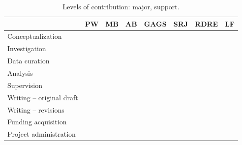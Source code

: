 \documentclass[journal=jctcce, manuscript=article]{achemso}
\begin{document}
\begin{table}
  \caption{Levels of contribution: \textcolor{blue!100}{major}, \textcolor{blue!25}{support}.}
  \label{tbl:example}
  \begin{tabular}{lccccccc}
    \toprule
                              & PW                   & MB                   & AB                   & GAGS                 & SRJ                  & RDRE                 & LF  \\
    \midrule
    Conceptualization         & \cellcolor{blue!100} &                      &   &                      & \cellcolor{blue!100} &                      & \cellcolor{blue!25}  \\ 
    Investigation             & \cellcolor{blue!100} & \cellcolor{blue!25}  & \cellcolor{blue!25}  & \cellcolor{blue!25}  & \cellcolor{blue!100} & \cellcolor{blue!25}  & \cellcolor{blue!25}  \\ 
    Data curation             & \cellcolor{blue!100} &                      &  \cellcolor{blue!25} &                      &                      &                      &                      \\ 
    Analysis                  & \cellcolor{blue!100} &                      &                      &                      & \cellcolor{blue!25}  & \cellcolor{blue!25}  & \cellcolor{blue!25}  \\ 
    Supervision               &                      &                      &                      &                      &                      &                      &                      \\ 
    Writing -- original draft & \cellcolor{blue!100} &                      &                      &                      & \cellcolor{blue!25}  &                      & \cellcolor{blue!25}  \\
    Writing -- revisions      & \cellcolor{blue!100} & \cellcolor{blue!25}  & \cellcolor{blue!25}  & \cellcolor{blue!25}  & \cellcolor{blue!25}  & \cellcolor{blue!25}  & \cellcolor{blue!25}  \\
    Funding acquisition       &                      &                      &                      &                      &                      &                      & \cellcolor{blue!100} \\ 
    Project administration    & \cellcolor{blue!100} &                      &                      &                      & \cellcolor{blue!100} &                      & \cellcolor{blue!100} \\
    \bottomrule
  \end{tabular}
\end{table}
\end{document}
